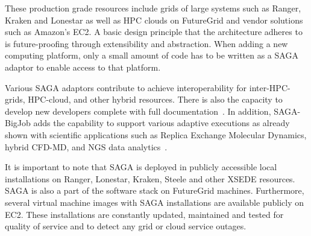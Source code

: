\documentclass[]{svjour3}
\begin{document}
These production grade resources include grids of large systems such as Ranger, 
Kraken and Lonestar as well as HPC clouds on FutureGrid and vendor solutions such 
as Amazon's EC2. A basic design principle that the architecture adheres to is 
future-proofing through extensibility and abstraction. When adding a new 
computing platform, only a small amount of code has to be written as a SAGA 
adaptor to enable access to that platform.

Various SAGA adaptors contribute to achieve interoperability for
inter-HPC-grids, HPC-cloud, and other hybrid resources. There is also the
capacity to develop new developers complete with full documentation~\cite{saga_url}.
In addition, SAGA-BigJob adds the
capability to support various adaptive executions as already shown
with scientific applications such as Replica Exchange Molecular
Dynamics, hybrid CFD-MD, and NGS data
analytics~\cite{saga-royalsoc,coupled,ecmls11}.

It is important to note that SAGA is deployed in publicly accessible local 
installations on Ranger, Lonestar, Kraken, Steele and other XSEDE resources. SAGA 
is also a part of the software stack on FutureGrid machines. Furthermore, several 
virtual machine images with SAGA installations are available publicly on EC2. These installations are constantly updated, 
maintained and tested for quality of service and to detect any grid or cloud service outages.

\end{document}
